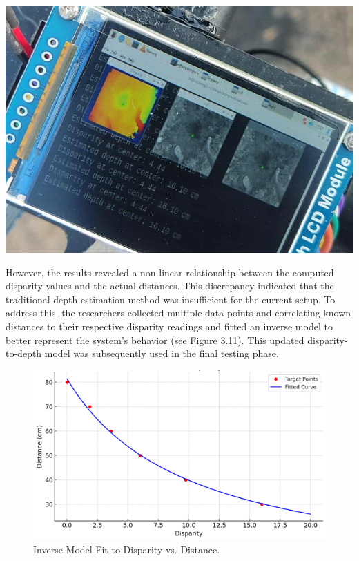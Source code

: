 \begin{center}
	\includegraphics[scale=0.30]{initialtest.jpg}
\end{center}

However, the results revealed a non-linear relationship between the computed disparity values and the actual distances. This discrepancy indicated that the traditional depth estimation method was insufficient for the current setup. To address this, the researchers collected multiple data points and correlating known distances to their respective disparity readings and fitted an inverse model to better represent the system's behavior (see Figure 3.11). This updated disparity-to-depth model was subsequently used in the final testing phase.

\begin{figure}[H]
	\centering
	\includegraphics[scale=0.55]{inversemodel.png}
	\caption{Inverse Model Fit to Disparity vs. Distance.\\}
	\label{fig:inverse}
\end{figure}




